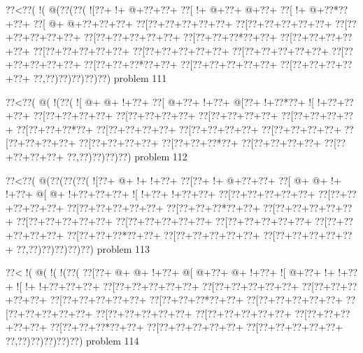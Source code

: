 \vbox{\vbox{\goo
\0??<\0??(\- !(\- @(\0??(\0??(
\- ![\0??+\- !+\- @+\0??+\0??+
\0??[\- !+\- @+\0??+\- @+\0??+
\0??[\- !+\- @+\0??*\0??+\0??+
\0??[\- @+\- @+\0??+\0??+\0??+
\0??[\0??+\0??+\0??+\0??+\0??+
\0??[\0??+\0??+\0??+\0??+\0??+
\0??[\0??+\0??+\0??+\0??+\0??+
\0??[\0??+\0??+\0??+\0??+\0??+
\0??[\0??+\0??+\0??*\0??+\0??+
\0??[\0??+\0??+\0??+\0??+\0??+
\0??[\0??+\0??+\0??+\0??+\0??+
\0??[\0??+\0??+\0??+\0??+\0??+
\0??[\0??+\0??+\0??+\0??+\0??+
\0??[\0??+\0??+\0??+\0??+\0??+
\0??[\0??+\0??+\0??*\0??+\0??+
\0??[\0??+\0??+\0??+\0??+\0??+
\0??[\0??+\0??+\0??+\0??+\0??+
\0??,\0??)\0??)\0??)\0??)\0??)
}
\hfil problem 111\hfil\break
}

\vbox{\vbox{\goo
\0??<\0??(\- @(\- !(\0??(
\- ![\- @+\- @+\- !+\0??+
\0??[\- @+\0??+\- !+\0??+
\- @[\0??+\- !+\0??*\0??+
\- ![\- !+\0??+\0??+\0??+
\0??[\0??+\0??+\0??+\0??+
\0??[\0??+\0??+\0??+\0??+
\0??[\0??+\0??+\0??+\0??+
\0??[\0??+\0??+\0??+\0??+
\0??[\0??+\0??+\0??*\0??+
\0??[\0??+\0??+\0??+\0??+
\0??[\0??+\0??+\0??+\0??+
\0??[\0??+\0??+\0??+\0??+
\0??[\0??+\0??+\0??+\0??+
\0??[\0??+\0??+\0??+\0??+
\0??[\0??+\0??+\0??*\0??+
\0??[\0??+\0??+\0??+\0??+
\0??[\0??+\0??+\0??+\0??+
\0??,\0??)\0??)\0??)\0??)
}
\hfil problem 112\hfil\break
}

\vbox{\vbox{\goo
\0??<\0??(\- @(\0??(\0??(\0??(
\- ![\0??+\- @+\- !+\- !+\0??+
\0??[\0??+\- !+\- @+\0??+\0??+
\0??[\- @+\- @+\- !+\- !+\0??+
\- @[\- @+\- !+\0??+\0??+\0??+
\- ![\- !+\0??+\- !+\0??+\0??+
\0??[\0??+\0??+\0??+\0??+\0??+
\0??[\0??+\0??+\0??+\0??+\0??+
\0??[\0??+\0??+\0??+\0??+\0??+
\0??[\0??+\0??+\0??*\0??+\0??+
\0??[\0??+\0??+\0??+\0??+\0??+
\0??[\0??+\0??+\0??+\0??+\0??+
\0??[\0??+\0??+\0??+\0??+\0??+
\0??[\0??+\0??+\0??+\0??+\0??+
\0??[\0??+\0??+\0??+\0??+\0??+
\0??[\0??+\0??+\0??*\0??+\0??+
\0??[\0??+\0??+\0??+\0??+\0??+
\0??[\0??+\0??+\0??+\0??+\0??+
\0??,\0??)\0??)\0??)\0??)\0??)
}
\hfil problem 113\hfil\break
}

\vbox{\vbox{\goo
\0??<\- !(\- @(\- !(\- !(\0??(
\0??[\0??+\- @+\- @+\- !+\0??+
\- @[\- @+\0??+\- @+\- !+\0??+
\- ![\- @+\0??+\- !+\- !+\0??+
\- ![\- !+\- !+\0??+\0??+\0??+
\0??[\0??+\0??+\0??+\0??+\0??+
\0??[\0??+\0??+\0??+\0??+\0??+
\0??[\0??+\0??+\0??+\0??+\0??+
\0??[\0??+\0??+\0??+\0??+\0??+
\0??[\0??+\0??+\0??*\0??+\0??+
\0??[\0??+\0??+\0??+\0??+\0??+
\0??[\0??+\0??+\0??+\0??+\0??+
\0??[\0??+\0??+\0??+\0??+\0??+
\0??[\0??+\0??+\0??+\0??+\0??+
\0??[\0??+\0??+\0??+\0??+\0??+
\0??[\0??+\0??+\0??*\0??+\0??+
\0??[\0??+\0??+\0??+\0??+\0??+
\0??[\0??+\0??+\0??+\0??+\0??+
\0??,\0??)\0??)\0??)\0??)\0??)
}
\hfil problem 114\hfil\break
}

